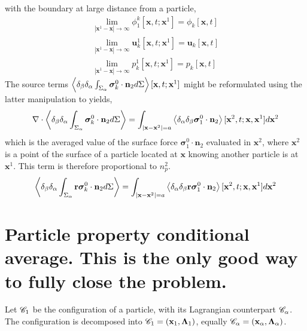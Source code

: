 with the boundary at large distance from a particle, 
\begin{align*}
    \lim_{|\textbf{x}^1 - \textbf{x}| \to \infty} \phi_1^k[\textbf{x},t;\textbf{x}^1] = \phi_k[\textbf{x},t]\\
    \lim_{|\textbf{x}^1 - \textbf{x}| \to \infty} \textbf{u}_k^1[\textbf{x},t;\textbf{x}^1] = \textbf{u}_k[\textbf{x},t]\\
    \lim_{|\textbf{x}^1 - \textbf{x}| \to \infty} p_k^1[\textbf{x},t;\textbf{x}^1] = p_k[\textbf{x},t]
\end{align*}
The source terms $\left<\delta_\beta\delta_\alpha \int_{\Sigma_\alpha} \bm\sigma_k^0 \cdot \textbf{n}_2 d\Sigma\right>[\textbf{x},t;\textbf{x}^1]$ might be reformulated using the latter manipulation to yields, 
\begin{equation*}
    \mathbf{\nabla}\cdot \left<\delta_\beta\delta_\alpha \int_{\Sigma_\alpha} \bm\sigma_k^0 \cdot \textbf{n}_2 d\Sigma\right>
    = 
    \int_{|\textbf{x}-\textbf{x}^2| = a}
    \left<\delta_\alpha \delta_\beta \bm\sigma_1^0\cdot\textbf{n}_2\right>
    [\textbf{x}^2,t;\textbf{x},\textbf{x}^1]
    d\textbf{x}^2
\end{equation*}
which is the averaged value of the surface force $\bm\sigma_1^0\cdot\textbf{n}_2$ evaluated in $\textbf{x}^2$, where $\textbf{x}^2$ is a point of the surface of a particle located at $\textbf{x}$ knowing another particle is at $\textbf{x}^1$.
This term is therefore proportional to $n_p^2$.  
\begin{equation*}
    \left<\delta_\beta\delta_\alpha \int_{\Sigma_\alpha} \textbf{r}\bm\sigma_k^0 \cdot \textbf{n}_2 d\Sigma\right>
    = 
    \int_{|\textbf{x}-\textbf{x}^2| = a}
    \left<\delta_\alpha \delta_\beta  \textbf{r}\bm\sigma_1^0\cdot\textbf{n}_2\right>
    [\textbf{x}^2,t;\textbf{x},\textbf{x}^1]
    d\textbf{x}^2
\end{equation*}



\section*{Particle property conditional average. This is the only good way to fully close the problem. }

Let $\mathscr{C}_1$ be the configuration of a particle, with its Lagrangian counterpart $\mathscr{C}_\alpha$. 
The configuration is decomposed into $\mathscr{C}_1 = (\textbf{x}_1, \bm\Lambda_1)$, equally $\mathscr{C}_\alpha = (\textbf{x}_\alpha,\bm\Lambda_\alpha)$.

